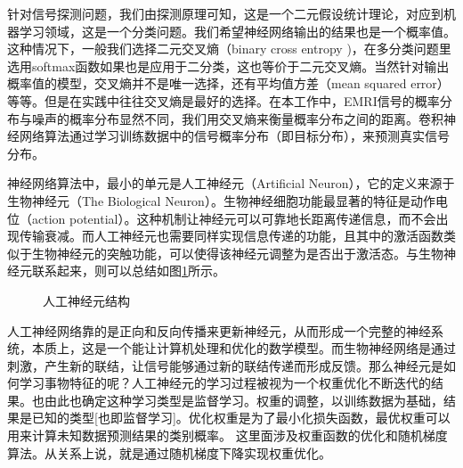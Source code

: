 针对信号探测问题，我们由探测原理可知，这是一个二元假设统计理论，对应到机器学习领域，这是一个分类问题。我们希望神经网络输出的结果也是一个概率值。这种情况下，一般我们选择二元交叉熵（binary cross entropy )，在多分类问题里选用softmax函数如果也是应用于二分类，这也等价于二元交叉熵。当然针对输出概率值的模型，交叉熵并不是唯一选择，还有平均值方差（mean squared error）等等。但是在实践中往往交叉熵是最好的选择。在本工作中，EMRI信号的概率分布与噪声的概率分布显然不同，我们用交叉熵来衡量概率分布之间的距离。卷积神经网络算法通过学习训练数据中的信号概率分布（即目标分布），来预测真实信号分布。


神经网络算法中，最小的单元是人工神经元（Artificial Neuron），它的定义来源于生物神经元（The Biological Neuron）。生物神经细胞功能最显著的特征是动作电位（action potential）。这种机制让神经元可以可靠地长距离传递信息，而不会出现传输衰减。而人工神经元也需要同样实现信息传递的功能，且其中的激活函数类似于生物神经元的突触功能，可以使得该神经元调整为是否出于激活态。与生物神经元联系起来，则可以总结如图\ref{fig3-AN}所示。

\begin{figure}[htbp]
\begin{center}
\caption{人工神经元结构}
\label{fig3-AN}
\end{center}
\end{figure}


人工神经网络靠的是正向和反向传播来更新神经元，从而形成一个完整的神经系统，本质上，这是一个能让计算机处理和优化的数学模型。而生物神经网络是通过刺激，产生新的联结，让信号能够通过新的联结传递而形成反馈。那么神经元是如何学习事物特征的呢？人工神经元的学习过程被视为一个权重优化不断迭代的结果。也由此也确定这种学习类型是监督学习。权重的调整，以训练数据为基础，结果是已知的类型[也即监督学习]。优化权重是为了最小化损失函数，最优权重可以用来计算未知数据预测结果的类别概率。%
这里面涉及权重函数的优化和随机梯度算法。从关系上说，就是通过随机梯度下降实现权重优化。

